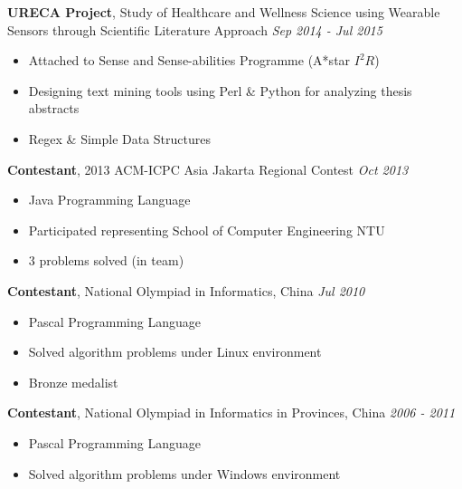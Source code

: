 \documentclass[a4paper, 12pt]{article}
\newenvironment{changemargin}[2]{%
  \begin{list}{}{%
      \setlength{\topsep}{0pt}%
      \setlength{\leftmargin}{#1}%
      \setlength{\rightmargin}{#2}%
      \setlength{\listparindent}{\parindent}%
      \setlength{\itemindent}{\parindent}%
      \setlength{\parsep}{\parskip}%
    }%
  \item[]}{\end{list}
}
\newenvironment{body}
{
\vspace*{-16pt}
\begin{changemargin}{-0.25in}{-0.5in}
}	
{
\end{changemargin}
}
\begin{document}
\begin{body}
  \vspace{14pt}

  \textbf{URECA Project}, {Study of Healthcare and Wellness Science using Wearable Sensors through Scientific Literature Approach} \hfill \emph{Sep 2014 - Jul 2015}\\
  \vspace*{-4pt}
  \begin{itemize} \itemsep -0pt  \small
  \item Attached to Sense and Sense-abilities Programme (A*star $I^{2}R$)
  \item Designing text mining tools using Perl \& Python for analyzing thesis abstracts
  \item Regex \& Simple Data Structures
  \end{itemize}

  \textbf{Contestant}, {2013 ACM-ICPC Asia Jakarta Regional Contest} \hfill \emph{Oct 2013}\\
  \vspace*{-4pt}
  \begin{itemize} \itemsep -0pt  \small
  \item Java Programming Language
  \item Participated representing School of Computer Engineering NTU
  \item 3 problems solved (in team)
  \end{itemize}
  
  \textbf {Contestant}, {National Olympiad in Informatics, China} \hfill \emph{Jul 2010}\\
  \vspace*{-4pt}
  \begin{itemize} \itemsep -0pt \small
  \item Pascal Programming Language
  \item Solved algorithm problems under Linux environment
  \item Bronze medalist
  \end{itemize}

  \textbf {Contestant}, {National Olympiad in Informatics in Provinces, China} \hfill \emph{2006 - 2011}\\
  \vspace*{-4pt}
  \begin{itemize} \itemsep -0pt \small
  \item Pascal Programming Language
  \item Solved algorithm problems under Windows environment
  \end{itemize}
\end{body}
\end{document}
